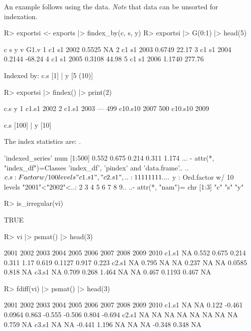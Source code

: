 \documentclass[article]{jss} %
\newcommand{\class}[1]{`\code{#1}'}
\begin{document}
An example follows using the  data. \emph{Note} that data can be unsorted for indexation.
\begin{Schunk}
\begin{Sinput}
R> exportsi <- exports |> findex_by(c, s, y)
R> exportsi |> G(0:1) |> head(5)
\end{Sinput}
\begin{Soutput}
   c  s    y      v   G1.v
1 c1 s1 2002 0.5525     NA
2 c1 s1 2003 0.6749  22.17
3 c1 s1 2004 0.2144 -68.24
4 c1 s1 2005 0.3108  44.98
5 c1 s1 2006 1.1740 277.76

Indexed by:  c.s [1] | y [5 (10)]
\end{Soutput}
\begin{Sinput}
R> exportsi |> findex() |> print(2)
\end{Sinput}
\begin{Soutput}
    c.s    y
1 c1.s1 2002
2 c1.s1 2003
---
499 c10.s10 2007
500 c10.s10 2009

c.s [100] | y [10]
\end{Soutput}
\end{Schunk}
The index statistics are: . %
\begin{Schunk}
\begin{Soutput}
 'indexed_series' num [1:500] 0.552 0.675 0.214 0.311 1.174 ...
 - attr(*, "index_df")=Classes 'index_df', 'pindex' and 'data.frame'..
  ..$ c.s: Factor w/ 100 levels "c1.s1","c2.s1",..: 1 1 1 1 1 1 1 1 ..
  ..$ y  : Ord.factor w/ 10 levels "2001"<"2002"<..: 2 3 4 5 6 7 8 9..
  ..- attr(*, "nam")= chr [1:3] "c" "s" "y"
\end{Soutput}
\begin{Sinput}
R> is_irregular(vi)
\end{Sinput}
\begin{Soutput}
[1] TRUE
\end{Soutput}
\begin{Sinput}
R> vi |> psmat() |> head(3)
\end{Sinput}
\begin{Soutput}
      2001  2002  2003  2004  2005 2006  2007   2008  2009  2010
c1.s1   NA 0.552 0.675 0.214 0.311 1.17 0.619 0.1127 0.917 0.223
c2.s1   NA 0.795    NA    NA 0.237   NA    NA 0.0585 0.818    NA
c3.s1   NA 0.709 0.268 1.464    NA   NA 0.467 0.1193 0.467    NA
\end{Soutput}
\begin{Sinput}
R> fdiff(vi) |> psmat() |> head(3)
\end{Sinput}
\begin{Soutput}
      2001 2002   2003   2004   2005  2006   2007   2008  2009   2010
c1.s1   NA   NA  0.122 -0.461 0.0964 0.863 -0.555 -0.506 0.804 -0.694
c2.s1   NA   NA     NA     NA     NA    NA     NA     NA 0.759     NA
c3.s1   NA   NA -0.441  1.196     NA    NA     NA -0.348 0.348     NA
\end{Soutput}
\end{Schunk}
\end{document}
